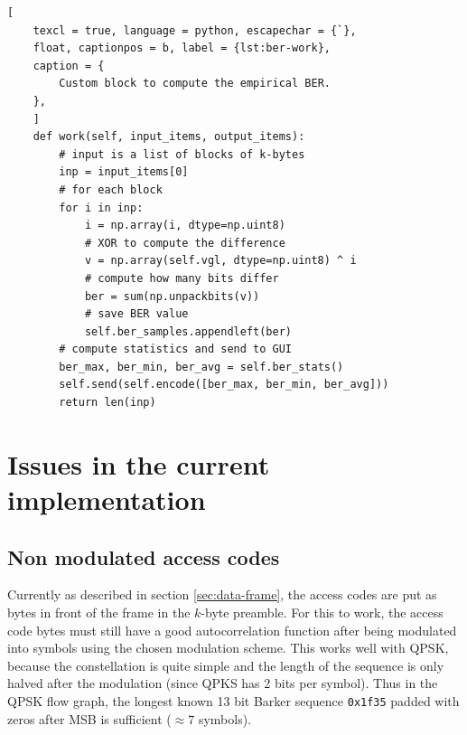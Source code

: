

\begin{lstlisting}[
	texcl = true, language = python, escapechar = {`},
	float, captionpos = b, label = {lst:ber-work},
	caption = {
		Custom block to compute the empirical BER.
	},
	]
	def work(self, input_items, output_items):
		# input is a list of blocks of k-bytes
		inp = input_items[0]
		# for each block
		for i in inp:
			i = np.array(i, dtype=np.uint8)
			# XOR to compute the difference
			v = np.array(self.vgl, dtype=np.uint8) ^ i
			# compute how many bits differ
			ber = sum(np.unpackbits(v))
			# save BER value
			self.ber_samples.appendleft(ber)
		# compute statistics and send to GUI
		ber_max, ber_min, ber_avg = self.ber_stats()
		self.send(self.encode([ber_max, ber_min, ber_avg]))
		return len(inp)
\end{lstlisting}

\section{Issues in the current implementation}

\subsection{Non modulated access codes}

Currently as described in section \ref{sec:data-frame}, the access codes are put as bytes in front of the frame in the \(k\)-byte preamble. For this to work, the access code bytes must still have a good autocorrelation function after being modulated into symbols using the chosen modulation scheme. This works well with QPSK, because the constellation is quite simple and the length of the sequence is only halved after the modulation (since QPKS has 2 bits per symbol). Thus in the QPSK flow graph, the longest known 13 bit Barker sequence \texttt{0x1f35} padded with zeros after MSB is sufficient (\(\approx 7\) symbols).

